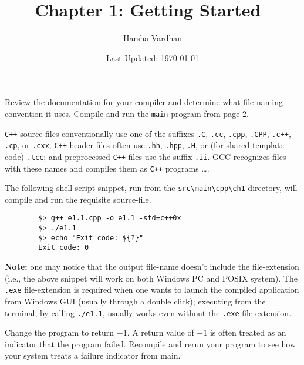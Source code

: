 \documentclass[12pt, a4paper]{article}
\begin{document}
    \title{Chapter 1: Getting Started~\cite{cpp-primer}}
    \author{Harsha Vardhan}
    \date{Last Updated: \today}

    \maketitle
    \bigskip

    \begin{tcolorbox}[title={Exercise: 1.1}]
        Review the documentation for your compiler and determine what file naming convention it uses.
        Compile and run the \texttt{main} program from page 2.
    \end{tcolorbox}

    \noindent \texttt{C++} source files conventionally use one of the suffixes \texttt{.C}, \texttt{.cc}, \texttt{.cpp}, \texttt{.CPP}, \texttt{.c++}, \texttt{.cp}, or \texttt{.cxx}; \texttt{C++} header files often use \texttt{.hh}, \texttt{.hpp}, \texttt{.H}, or (for shared template code) \texttt{.tcc}; and preprocessed \texttt{C++} files use the suffix \texttt{.ii}.
    GCC recognizes files with these names and compiles them as \texttt{C++} programs \dots \cite{gcc-manpage}.

    \noindent The following shell-script snippet, run from the \texttt{src\textbackslash main\textbackslash cpp\textbackslash ch1} directory, will compile and run the requisite source-file.
    \begin{verbatim}
        $> g++ e1.1.cpp -o e1.1 -std=c++0x
        $> ./e1.1
        $> echo "Exit code: ${?}"
        Exit code: 0
    \end{verbatim}

    \noindent\textbf{Note:} one may notice that the output file-name doesn't include the file-extension (i.e., the above snippet will work on both Windows PC and POSIX system).
    The \texttt{.exe} file-extension is required when one wants to launch the compiled application from Windows GUI (usually through a double click); executing from the terminal, by calling \texttt{./e1.1}, usually works even without the \texttt{.exe} file-extension.

    \bigskip
    \begin{tcolorbox}[title={Exercise: 1.2}]
        Change the program to return $-1$.
        A return value of $-1$ is often treated as an indicator that the program failed.
        Recompile and rerun your program to see how your system treats a failure indicator from main.
    \end{tcolorbox}
\end{document}
